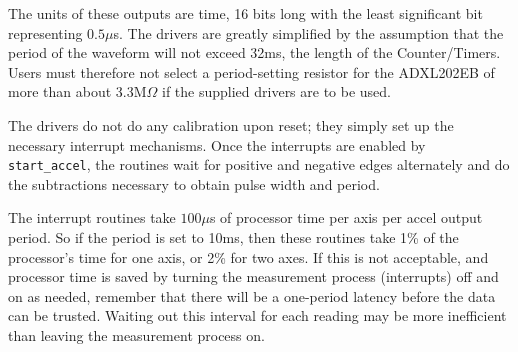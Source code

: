 The units of these outputs are time, 16 bits long with the least
significant bit representing $0.5\mu$s.  The drivers are greatly
simplified by the assumption that the period of the waveform will not
exceed 32ms, the length of the Counter/Timers.  Users must therefore
not select a period-setting resistor for the ADXL202EB of more than
about 3.3M$\Omega$ if the supplied drivers are to be used. 

The drivers do not do any calibration upon reset; they simply set up
the necessary interrupt mechanisms.  Once the interrupts are enabled by
{\tt start\_accel}, the routines wait for positive and negative edges alternately
and do the subtractions necessary to obtain pulse width and period.

The interrupt routines take $100\mu$s of processor time per axis per accel
output period.  So if the period is set to 10ms, then these routines
take 1\% of the processor's time for one axis, or 2\% for two axes.  If
this is not acceptable, and processor time is saved by turning the
measurement process (interrupts) off and on as needed, remember that
there will be a one-period latency before the data can be trusted.
Waiting out this interval for each reading may be more inefficient
than leaving the measurement process on.
